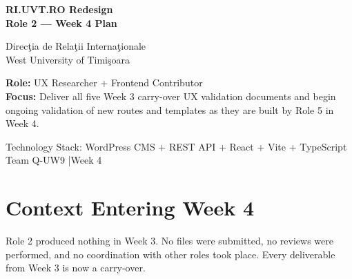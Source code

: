 \documentclass[12pt,a4paper]{article}
\begin{document}

\begin{titlepage}
    \pagecolor{uvtDarkBlue}
    \color{white}

    \vspace*{2cm}

    {\Huge\bfseries RI.UVT.RO Redesign\\[0.25em]
    Role 2 --- Week 4 Plan\par}

    \vspace{0.8cm}

    {\Large Direc\c{t}ia de Rela\c{t}ii Interna\c{t}ionale\\
    West University of Timi\c{s}oara\par}

    \vspace{1.5cm}

    \begin{yellowbox}
        \color{textGray}
        \textbf{Role:} UX Researcher + Frontend Contributor\\[0.3em]
        \textbf{Focus:} Deliver all five Week 3 carry-over UX validation documents
        and begin ongoing validation of new routes and templates as they are built
        by Role 5 in Week 4.
    \end{yellowbox}

    \vfill

    {\large Technology Stack: WordPress CMS + REST API + React + Vite + TypeScript\\[0.4em]
    Team Q-UW9 \quad|\quad Week 4}

    \vspace{1cm}
\end{titlepage}

\nopagecolor
\color{textGray}

\tableofcontents
\newpage

\section{Context Entering Week 4}

\begin{redbox}
Role 2 produced nothing in Week 3. No files were submitted, no reviews were performed,
and no coordination with other roles took place. Every deliverable from Week 3 is now a
carry-over.
\end{redbox}
\end{document}
